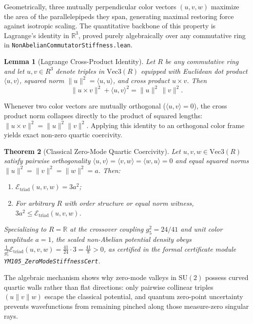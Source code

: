 \documentclass[11pt,a4paper]{article}
\newtheorem{theorem}{Theorem}[section]
\newtheorem{lemma}[theorem]{Lemma}
\newcommand{\R}{\mathbb{R}}
\newcommand{\SU}{\mathrm{SU}}
\begin{document}
Geometrically, three mutually perpendicular color vectors $(u, v, w)$ maximize the area of the parallelepipeds they span, generating maximal restoring force against isotropic scaling. The quantitative backbone of this property is Lagrange's identity in $\R^3$, proved purely algebraically over any commutative ring in \texttt{NonAbelianCommutatorStiffness.lean}.

\begin{lemma}[Lagrange Cross-Product Identity]
Let $R$ be any commutative ring and let $u, v \in R^3$ denote triples in $\mathrm{Vec3}(R)$ equipped with Euclidean dot product $\langle u, v \rangle$, squared norm $\|u\|^2 = \langle u, u \rangle$, and cross product $u \times v$. Then
\begin{equation}
\|u \times v\|^2 + \langle u, v \rangle^2 = \|u\|^2 \, \|v\|^2.
\end{equation}
\end{lemma}

Whenever two color vectors are mutually orthogonal ($\langle u, v \rangle = 0$), the cross product norm collapses directly to the product of squared lengths: $\|u \times v\|^2 = \|u\|^2 \|v\|^2$. Applying this identity to an orthogonal color frame yields exact non-zero quartic coercivity.

\begin{theorem}[Classical Zero-Mode Quartic Coercivity]
Let $u, v, w \in \mathrm{Vec3}(R)$ satisfy pairwise orthogonality $\langle u, v \rangle = \langle v, w \rangle = \langle w, u \rangle = 0$ and equal squared norms $\|u\|^2 = \|v\|^2 = \|w\|^2 = a$. Then:
\begin{enumerate}
\item $\mathcal{E}_{\mathrm{triad}}(u, v, w) = 3 a^2$;
\item For arbitrary $R$ with order structure or equal norm witness, $3 a^2 \le \mathcal{E}_{\mathrm{triad}}(u, v, w)$.
\end{enumerate}
Specializing to $R = \R$ at the crossover coupling $g_5^2 = 24/41$ and unit color amplitude $a = 1$, the scaled non-Abelian potential density obeys $\frac{1}{g_5^2} \mathcal{E}_{\mathrm{triad}}(u, v, w) = \frac{41}{24} \cdot 3 = \frac{41}{8} > 0$, as certified in the formal certificate module \texttt{YM105\_\-ZeroModeStiffnessCert}.
\end{theorem}

The algebraic mechanism shows why zero-mode valleys in $\SU(2)$ possess curved quartic walls rather than flat directions: only pairwise collinear triples $(u \parallel v \parallel w)$ escape the classical potential, and quantum zero-point uncertainty prevents wavefunctions from remaining pinched along those measure-zero singular rays.
\end{document}
